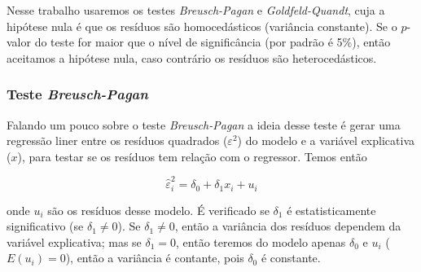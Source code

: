 \noindent Nesse trabalho usaremos os testes \textit{Breusch-Pagan} e \textit{Goldfeld-Quandt}, cuja a hipótese nula é que os resíduos são homocedásticos (variância constante). Se o $p$-valor do teste for maior que o nível de significância (por padrão é 5\%), então aceitamos a hipótese nula, caso contrário os resíduos são heterocedásticos.

\subsubsection{Teste \textit{Breusch-Pagan}}

\noindent Falando um pouco sobre o teste \textit{Breusch-Pagan} a ideia desse teste é gerar uma regressão liner entre os resíduos quadrados ($\varepsilon^2$) do modelo e a variável explicativa ($x$), para testar se os resíduos tem relação com o regressor. Temos então

$$ \hat{\varepsilon}^2_i = \delta_0 + \delta_1 x_i + u_i$$

\noindent onde $u_i$ são os resíduos desse modelo. É verificado se $\delta_1$ é estatisticamente significativo (se $\delta_1 \neq 0$). Se $\delta_1 \neq 0$, então a variância dos resíduos dependem da variável explicativa; mas se $\delta_1 = 0$, então teremos do modelo apenas $\delta_0$ e $u_i$ ($E(u_i) = 0$), então a variância é contante, pois $\delta_0$ é constante.













